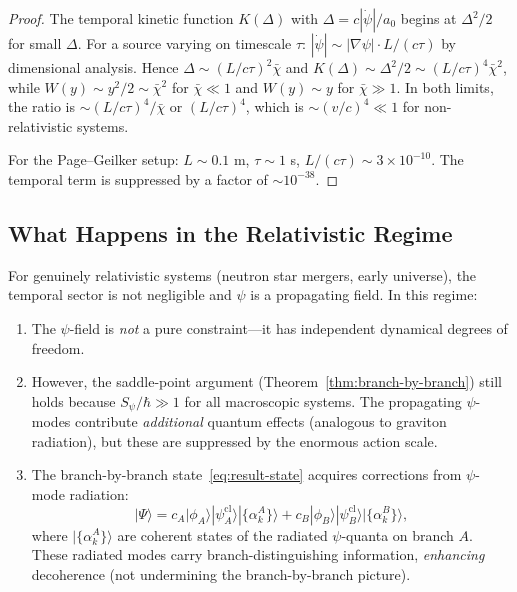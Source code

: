 \documentclass[11pt,a4paper]{article}
\begin{document}
\begin{proof}
The temporal kinetic function $K(\Delta)$ with $\Delta = c|\dot\psi|/a_0$
begins at $\Delta^2/2$ for small $\Delta$. For a source varying on
timescale $\tau$: $|\dot\psi| \sim |\nabla\psi| \cdot L/(c\tau)$ by
dimensional analysis. Hence
$\Delta \sim (L/c\tau)^2 \bar\chi$ and
$K(\Delta) \sim \Delta^2/2 \sim (L/c\tau)^4\bar\chi^2$,
while $W(y) \sim y^2/2 \sim \bar\chi^2$ for $\bar\chi \ll 1$ and
$W(y) \sim y$ for $\bar\chi \gg 1$. In both limits, the ratio is
$\sim (L/c\tau)^4/\bar\chi$ or $(L/c\tau)^4$, which is
$\sim (v/c)^4 \ll 1$ for non-relativistic systems.

For the Page--Geilker setup: $L \sim 0.1$ m, $\tau \sim 1$ s,
$L/(c\tau) \sim 3 \times 10^{-10}$. The temporal term is suppressed by
a factor of $\sim 10^{-38}$.
\end{proof}

\subsection{What Happens in the Relativistic Regime}

For genuinely relativistic systems (neutron star mergers, early universe),
the temporal sector is not negligible and $\psi$ is a propagating field.
In this regime:

\begin{enumerate}
\item The $\psi$-field is \emph{not} a pure constraint---it has independent
dynamical degrees of freedom.

\item However, the saddle-point argument (Theorem~\ref{thm:branch-by-branch})
still holds because $S_\psi/\hbar \gg 1$ for all macroscopic systems. The
propagating $\psi$-modes contribute \emph{additional} quantum effects
(analogous to graviton radiation), but these are suppressed by the
enormous action scale.

\item The branch-by-branch state~\eqref{eq:result-state} acquires
corrections from $\psi$-mode radiation:
\begin{equation}
|\Psi\rangle = c_A|\phi_A\rangle|\psi_A^\mathrm{cl}\rangle
|\{\alpha_k^A\}\rangle
+ c_B|\phi_B\rangle|\psi_B^\mathrm{cl}\rangle
|\{\alpha_k^B\}\rangle,
\end{equation}
where $|\{\alpha_k^A\}\rangle$ are coherent states of the radiated
$\psi$-quanta on branch $A$. These radiated modes carry
branch-distinguishing information, \emph{enhancing} decoherence
(not undermining the branch-by-branch picture).
\end{enumerate}
\end{document}
